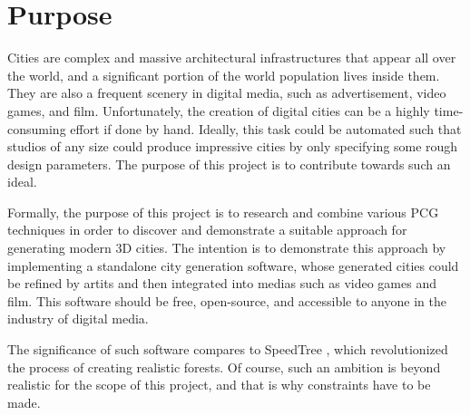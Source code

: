 \section{Purpose}


Cities are complex and massive architectural infrastructures that appear all over the world, and a significant portion of the world population lives inside them.
They are also a frequent scenery in digital media, such as advertisement, video games, and film.
Unfortunately, the creation of digital cities can be a highly time-consuming effort if done by hand.
Ideally, this task could be automated such that studios of any size could produce impressive cities by only specifying some rough design parameters.
The purpose of this project is to contribute towards such an ideal.

Formally, the purpose of this project is to research and combine various PCG techniques in order to discover and demonstrate a suitable approach for generating modern 3D cities. 
The intention is to demonstrate this approach by implementing a standalone city generation software, whose generated cities could be refined by artits and then integrated into medias such as video games and film.
This software should be free, open-source, and accessible to anyone in the industry of digital media.

The significance of such software compares to SpeedTree \cite{speedtree}, which revolutionized the process of creating realistic forests.
Of course, such an ambition is beyond realistic for the scope of this project, and that is why constraints have to be made.